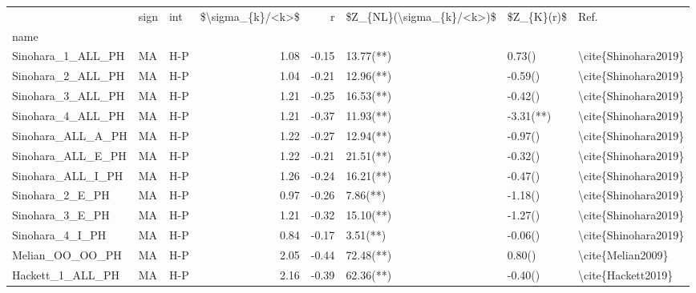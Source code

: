 \begin{tabular}{lllrrlll}
\toprule
{} & sign &   int &  \$\textbackslash sigma\_\{k\}/<k>\$ &     r & \$Z\_\{NL\}(\textbackslash sigma\_\{k\}/<k>)\$ & \$Z\_\{K\}(r)\$ &                  Ref. \\
name               &      &       &                   &       &                          &            &                       \\
\midrule
Sinohara\_1\_ALL\_PH  &   MA &   H-P &              1.08 & -0.15 &                13.77(**) &     0.73() &  \textbackslash cite\{Shinohara2019\} \\
Sinohara\_2\_ALL\_PH  &   MA &   H-P &              1.04 & -0.21 &                12.96(**) &    -0.59() &  \textbackslash cite\{Shinohara2019\} \\
Sinohara\_3\_ALL\_PH  &   MA &   H-P &              1.21 & -0.25 &                16.53(**) &    -0.42() &  \textbackslash cite\{Shinohara2019\} \\
Sinohara\_4\_ALL\_PH  &   MA &   H-P &              1.21 & -0.37 &                11.93(**) &  -3.31(**) &  \textbackslash cite\{Shinohara2019\} \\
Sinohara\_ALL\_A\_PH  &   MA &   H-P &              1.22 & -0.27 &                12.94(**) &    -0.97() &  \textbackslash cite\{Shinohara2019\} \\
Sinohara\_ALL\_E\_PH  &   MA &   H-P &              1.22 & -0.21 &                21.51(**) &    -0.32() &  \textbackslash cite\{Shinohara2019\} \\
Sinohara\_ALL\_I\_PH  &   MA &   H-P &              1.26 & -0.24 &                16.21(**) &    -0.47() &  \textbackslash cite\{Shinohara2019\} \\
Sinohara\_2\_E\_PH    &   MA &   H-P &              0.97 & -0.26 &                 7.86(**) &    -1.18() &  \textbackslash cite\{Shinohara2019\} \\
Sinohara\_3\_E\_PH    &   MA &   H-P &              1.21 & -0.32 &                15.10(**) &    -1.27() &  \textbackslash cite\{Shinohara2019\} \\
Sinohara\_4\_I\_PH    &   MA &   H-P &              0.84 & -0.17 &                 3.51(**) &    -0.06() &  \textbackslash cite\{Shinohara2019\} \\
Melian\_OO\_OO\_PH    &   MA &   H-P &              2.05 & -0.44 &                72.48(**) &     0.80() &     \textbackslash cite\{Melian2009\} \\
Hackett\_1\_ALL\_PH   &   MA &   H-P &              2.16 & -0.39 &                62.36(**) &    -0.40() &    \textbackslash cite\{Hackett2019\} \\

\end{tabular}
